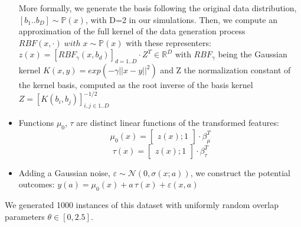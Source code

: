 \documentclass[10pt,twocolumn]{article}
\begin{document}
\begin{itemize}
          More formally, we generate the basis following the original data
          distribution, $\left [ b_1 .. b_D \right ] \sim \mathbb P(x)$,
          with D=2 in our simulations. Then, we compute an approximation
          of the full kernel of the data generation process $RBF(x,
              \cdot) \;  with \; x \sim \mathbb P(x)$ with these
          representers: $z(x) = [RBF_{\gamma}(x, b_d)]_{d=1..D} \cdot
              Z^T \in \mathbb{R}^D$ with $RBF_{\gamma}$ being the Gaussian
          kernel $K(x, y) = exp(-\gamma ||x-y||^2)$ and Z the
          normalization constant of the kernel basis, computed as the
          root inverse of the basis kernel $Z=[K(b_i, b_j)]_{i, j \in
              {1..D}}^{-1/2}$


    \item Functions $\mu_0$, $\tau$ are distinct linear functions of the
          transformed features:
          \begin{equation*}
              \mu_0(x) = \begin{bmatrix} z(x); 1 \end{bmatrix} \cdot \beta_{\mu}^T
          \end{equation*}
          \begin{equation*}
              \tau(x) = \begin{bmatrix} z(x); 1 \end{bmatrix} \cdot \beta_{\tau}^T
          \end{equation*}
    \item Adding a Gaussian noise, $\varepsilon \sim \mathcal N(0, \sigma(x;a))$,
          we construct the potential outcomes:
          $y(a) = \mu_0(x) + a\,\tau(x) + \varepsilon(x, a)$
\end{itemize}
We generated 1000 instances of this dataset with uniformly random overlap
parameters $\theta \in \left[ 0, 2.5 \right]$.
\end{document}
